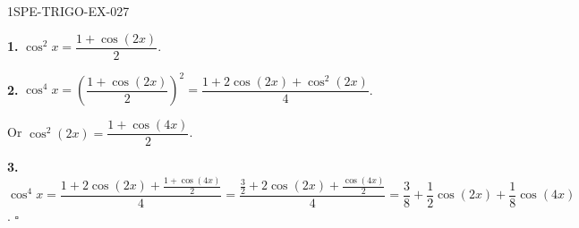 \begin{corrige}{1SPE-TRIGO-EX-027}

\textbf{1.} $\cos^2 x = \dfrac{1 + \cos(2x)}{2}$.

\textbf{2.} $\cos^4 x = \left(\dfrac{1+\cos(2x)}{2}\right)^2 = \dfrac{1 + 2\cos(2x) + \cos^2(2x)}{4}$.

Or $\cos^2(2x) = \dfrac{1+\cos(4x)}{2}$.

\textbf{3.} $\cos^4 x = \dfrac{1 + 2\cos(2x) + \frac{1+\cos(4x)}{2}}{4} = \dfrac{\frac{3}{2} + 2\cos(2x) + \frac{\cos(4x)}{2}}{4} = \dfrac{3}{8} + \dfrac{1}{2}\cos(2x) + \dfrac{1}{8}\cos(4x)$. \hfill $\square$

\end{corrige}
